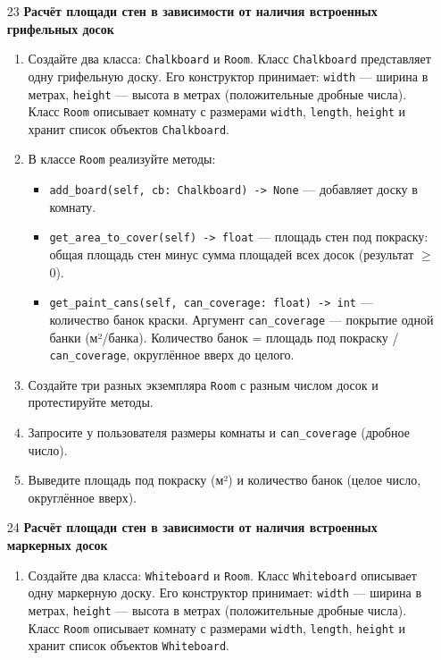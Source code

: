 \begin{enumerate}
\item[23] \textbf{Расчёт площади стен в зависимости от наличия встроенных грифельных досок}
\begin{enumerate}
    \item Создайте два класса: \texttt{Chalkboard} и \texttt{Room}.  
    Класс \texttt{Chalkboard} представляет одну грифельную доску. Его конструктор принимает:  
    \texttt{width} — ширина в метрах,  
    \texttt{height} — высота в метрах (положительные дробные числа).  
    Класс \texttt{Room} описывает комнату с размерами \texttt{width}, \texttt{length}, \texttt{height} и хранит список объектов \texttt{Chalkboard}.

    \item В классе \texttt{Room} реализуйте методы:  
    \begin{itemize}
        \item \texttt{add\_board(self, cb: Chalkboard) -> None} — добавляет доску в комнату.
        \item \texttt{get\_area\_to\_cover(self) -> float} — площадь стен под покраску: общая площадь стен минус сумма площадей всех досок (результат $\geqslant$ 0).
        \item \texttt{get\_paint\_cans(self, can\_coverage: float) -> int} — количество банок краски. Аргумент \texttt{can\_coverage} — покрытие одной банки (м²/банка). Количество банок = площадь под покраску / \texttt{can\_coverage}, округлённое вверх до целого.
    \end{itemize}

    \item Создайте три разных экземпляра \texttt{Room} с разным числом досок и протестируйте методы.

    \item Запросите у пользователя размеры комнаты и \texttt{can\_coverage} (дробное число).

    \item Выведите площадь под покраску (м²) и количество банок (целое число, округлённое вверх).
\end{enumerate}

\item[24] \textbf{Расчёт площади стен в зависимости от наличия встроенных маркерных досок}
\begin{enumerate}
    \item Создайте два класса: \texttt{Whiteboard} и \texttt{Room}.  
    Класс \texttt{Whiteboard} описывает одну маркерную доску. Его конструктор принимает:  
    \texttt{width} — ширина в метрах,  
    \texttt{height} — высота в метрах (положительные дробные числа).  
    Класс \texttt{Room} описывает комнату с размерами \texttt{width}, \texttt{length}, \texttt{height} и хранит список объектов \texttt{Whiteboard}.


\end{enumerate}
\end{enumerate}
